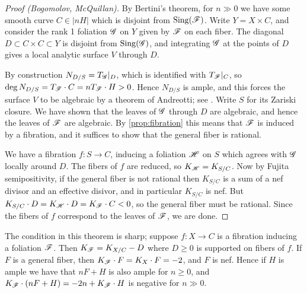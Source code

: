 \begin{proof}[Proof (Bogomolov, McQuillan)]
    By Bertini's theorem, for $n\gg0$ we have some smooth curve $C\in|nH|$ which
    is disjoint from $\operatorname{Sing}(\mathscr{F})$. Write $Y=X\times C$, and consider the rank
    1 foliation $\mathscr{G}$ on $Y$ given by $\mathscr{F}$ on each fiber. The diagonal
    $D\subset C\times C\subset Y$ is disjoint from $\operatorname{Sing}(\mathscr{G})$, and
    integrating $\mathscr{G}$ at the points of $D$ gives a local analytic surface $V$
    through $D$.

    By construction $N_{D/S}=T_{\mathscr{G}}|_D$, which is identified with $T_{\mathscr{F}}|_C$,
    so $\deg N_{D/S}=T_{\mathscr{F}}\cdot C=nT_{\mathscr{F}}\cdot H>0$. Hence $N_{D/S}$ is
    ample, and this forces the surface $V$ to be algebraic by a theorem of
    Andreotti; see \cite[Thm 3.4]{bost_13}. Write $S$ for its Zariski closure.
    We have shown that the leaves of $\mathscr{G}$ through $D$ are algebraic, and
    hence the leaves of $\mathscr{F}$ are algebraic. By \cref{prop:fibration} this
    means that $\mathscr{F}$ is induced by a fibration, and it suffices to show that
    the general fiber is rational.

    We have a fibration $f:S\to C$, inducing a foliation $\mathscr{H}$ on $S$ which
    agrees with $\mathscr{G}$ locally around $D$. The fibers of $f$ are reduced, so
    $K_{\mathscr{H}}=K_{S/C}$. Now by Fujita semipositivity, if the general fiber is not
    rational then $K_{S/C}$ is a sum of a nef divisor and an effective disivor,
    and in particular $K_{S/C}$ is nef. But
    $K_{S/C}\cdot D=K_{\mathscr{H}}\cdot D=K_{\mathscr{F}}\cdot C<0$, so the general fiber must
    be rational. Since the fibers of $f$ correspond to the leaves of $\mathscr{F}$, we
    are done.
\end{proof}

\begin{remark}
    The condition in this theorem is sharp; suppose $f:X\to C$ is a fibration
    inducing a foliation $\mathscr{F}$. Then $K_{\mathscr{F}}=K_{X/C}-D$ where $D\ge0$ is
    supported on fibers of $f$. If $F$ is a general fiber, then
    $K_{\mathscr{F}}\cdot F=K_X\cdot F=-2$, and $F$ is nef. Hence if $H$ is ample we
    have that $nF+H$ is also ample for $n\ge0$, and
    $K_{\mathscr{F}}\cdot(nF+H)=-2n+K_{\mathscr{F}}\cdot H$ is negative for $n\gg0$.
\end{remark}
